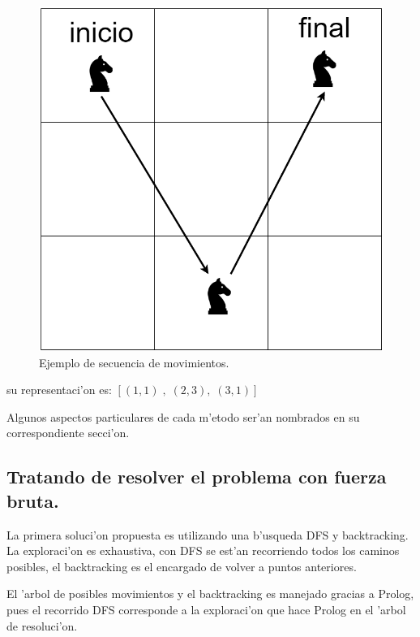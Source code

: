 \documentclass[12pt]{article}
\begin{document}
\begin{itemize}
        \begin{figure}[H]
            \centering
            \includegraphics[scale=0.25]{recorrido1.png}
            \caption{Ejemplo de secuencia de movimientos.}
            \label{fig:recorrido1}
        \end{figure}


        su representaci'on es: $[ (1,1) \; ,\; (2,3),\; (3,1) ]$

    \end{itemize}

    Algunos aspectos particulares de cada m'etodo ser'an nombrados
    en su correspondiente secci'on.


    \subsection{Tratando de resolver el problema con fuerza
    bruta.}

    La primera soluci'on propuesta es utilizando una b'usqueda DFS y backtracking.
    La exploraci'on es exhaustiva, con DFS se est'an recorriendo todos los caminos posibles, el backtracking
    es el encargado de volver a puntos anteriores.

    El 'arbol de posibles movimientos y el backtracking es manejado
    gracias a Prolog, pues el recorrido DFS corresponde
    a la exploraci'on que hace Prolog en el 'arbol de resoluci'on.
\end{document}
